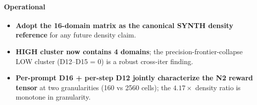 \paragraph{Operational}
\begin{itemize}
\item \textbf{Adopt the 16-domain matrix as the canonical SYNTH density reference} for any future density claim.
\item \textbf{HIGH cluster now contains 4 domains}; the precision-frontier-collapse LOW cluster (D12--D15 = 0) is a robust cross-iter finding.
\item \textbf{Per-prompt D16 + per-step D12 jointly characterize the N2 reward tensor} at two granularities (160 vs 2560 cells); the $4.17\times$ density ratio is monotone in granularity.
\end{itemize}